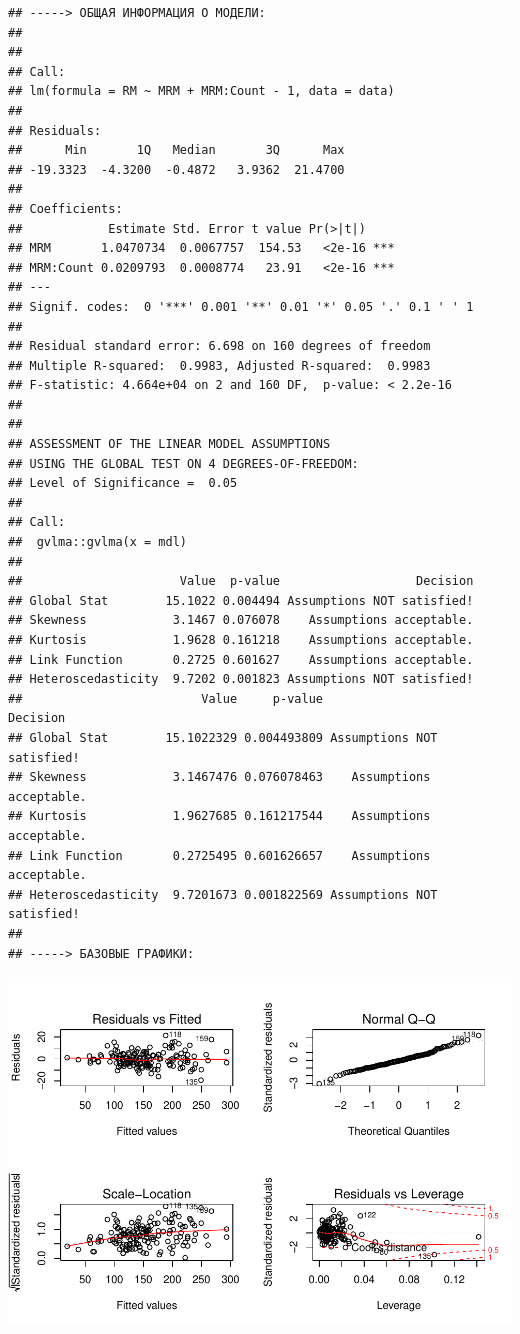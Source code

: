 \documentclass[
]{article}
\begin{document}
\begin{verbatim}
## -----> ОБЩАЯ ИНФОРМАЦИЯ О МОДЕЛИ:
## 
## 
## Call:
## lm(formula = RM ~ MRM + MRM:Count - 1, data = data)
## 
## Residuals:
##      Min       1Q   Median       3Q      Max 
## -19.3323  -4.3200  -0.4872   3.9362  21.4700 
## 
## Coefficients:
##            Estimate Std. Error t value Pr(>|t|)    
## MRM       1.0470734  0.0067757  154.53   <2e-16 ***
## MRM:Count 0.0209793  0.0008774   23.91   <2e-16 ***
## ---
## Signif. codes:  0 '***' 0.001 '**' 0.01 '*' 0.05 '.' 0.1 ' ' 1
## 
## Residual standard error: 6.698 on 160 degrees of freedom
## Multiple R-squared:  0.9983, Adjusted R-squared:  0.9983 
## F-statistic: 4.664e+04 on 2 and 160 DF,  p-value: < 2.2e-16
## 
## 
## ASSESSMENT OF THE LINEAR MODEL ASSUMPTIONS
## USING THE GLOBAL TEST ON 4 DEGREES-OF-FREEDOM:
## Level of Significance =  0.05 
## 
## Call:
##  gvlma::gvlma(x = mdl) 
## 
##                      Value  p-value                   Decision
## Global Stat        15.1022 0.004494 Assumptions NOT satisfied!
## Skewness            3.1467 0.076078    Assumptions acceptable.
## Kurtosis            1.9628 0.161218    Assumptions acceptable.
## Link Function       0.2725 0.601627    Assumptions acceptable.
## Heteroscedasticity  9.7202 0.001823 Assumptions NOT satisfied!
##                         Value     p-value                   Decision
## Global Stat        15.1022329 0.004493809 Assumptions NOT satisfied!
## Skewness            3.1467476 0.076078463    Assumptions acceptable.
## Kurtosis            1.9627685 0.161217544    Assumptions acceptable.
## Link Function       0.2725495 0.601626657    Assumptions acceptable.
## Heteroscedasticity  9.7201673 0.001822569 Assumptions NOT satisfied!
## 
## -----> БАЗОВЫЕ ГРАФИКИ:
\end{verbatim}

\begin{center}\includegraphics[width=0.9\linewidth]{Regression-model-for-estimating-RM_files/figure-latex/unnamed-chunk-32-4} \end{center}
\end{document}
